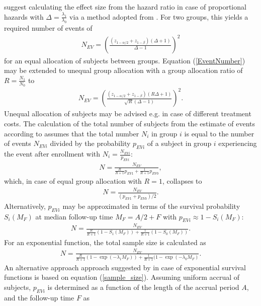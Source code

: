\documentclass[main.tex]{subfiles}
\begin{document}
\textcite{kleinbaum2012survival} suggest calculating the effect size from the hazard ratio in case of proportional hazards with $\Delta=\frac{\lambda_1}{\lambda_0}$ via a method adopted from \textcite{freedman1982tables}. For two groups, this yields a required number of events of
\begin{align}\label{EventNumber}
N_{EV}=\left( \frac{(z_{1-\alpha /2}+z_{1-\beta})(\Delta +1)}{\Delta-1}\right)^2
\end{align} \label{Freedman}
for an equal allocation of subjects between groups. Equation (\ref{EventNumber}) may be extended to unequal group allocation with a group allocation ratio of $R=\frac{N_1}{N_0}$ to
\begin{align}\label{general_sample_size}
N_{EV}=\left( \frac{(z_{1-\alpha /2}+z_{1-\beta})(R\Delta +1)}{\sqrt{R}(\Delta-1)}\right)^2.
\end{align}
Unequal allocation of subjects may be advised e.g. in case of different treatment costs. The calculation of the total number of subjects from the estimate of events according to \textcite{kleinbaum2012survival} assumes that the total number $N_i$ in group $i$ is equal to the number of events $N_{EVi}$ divided by the probability $p_{EVi}$ of a subject in group $i$ experiencing the event after enrollment with $N_i=\frac{N_{EVi}}{p_{EVi}}$:
\begin{align}\label{sample_size}
N=\frac{N_{EV}}{\frac{R}{R+1}p_{EV1}+\frac{1}{R+1}p_{EV0}},
\end{align}
which, in case of equal group allocation with $R=1$, collapses to
\begin{align}
N=\frac{N_{EV}}{(p_{EV1}+p_{EV0})/2}.
\end{align}
Alternatively, $p_{EVi}$ may be approximated in terms of the survival probability $S_i(M_F)$ at median follow-up time $M_F=A/2+F$ with $p_{EVi}\approx 1-S_i(M_F)$:
\begin{align}
N=\frac{N_{EV}}{\frac{R}{R+1}(1-S_1(M_F))+\frac{1}{R+1}(1-S_0(M_F))}.
\end{align}
For an exponential function, the total sample size is calculated as
\begin{align}
N=\frac{N_{EV}}{\frac{R}{R+1}(1-\exp{(- \lambda_1 M_F)})+\frac{1}{R+1}(1-\exp{(-\lambda_0 M_F)}}.
\end{align}
An alternative approach approach suggested by \textcite{kleinbaum2012survival} in case of exponential survival functions is based on equation (\ref{sample_size}). Assuming uniform accrual of subjects, $p_{EVi}$ is determined as a function of the length of the accrual period $A$, and the follow-up time $F$ as
\end{document}
